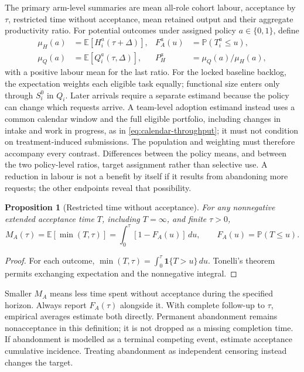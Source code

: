 \documentclass[11pt,a4paper]{amsart}
\newtheorem{proposition}{Proposition}[section]
\theoremstyle{definition}
\theoremstyle{remark}
\newcommand{\E}{\mathbb E}
\newcommand{\Prb}{\mathbb P}
\newcommand{\ind}{\mathbf 1}
\begin{document}
The primary arm-level summaries are mean all-role cohort labour, acceptance by $\tau$, restricted time without acceptance, mean retained output and their aggregate productivity ratio. For potential outcomes under assigned policy $a\in\{0,1\}$, define
\begin{equation}
\label{eq:estimands}
 \begin{aligned}
 \mu_H(a)&=\E[H_i^a(\tau+\Delta)],&
 F_A^a(u)&=\Prb(T_i^a\leq u),\\
 \mu_Q(a)&=\E[Q_i^a(\tau,\Delta)],&
 P_H^a&=\mu_Q(a)/\mu_H(a),
 \end{aligned}
\end{equation}
with a positive labour mean for the last ratio. For the locked baseline backlog, the expectation weights each eligible task equally; functional size enters only through $S_i^0$ in $Q_i$. Later arrivals require a separate estimand because the policy can change which requests arrive. A team-level adoption estimand instead uses a common calendar window and the full eligible portfolio, including changes in intake and work in progress, as in \eqref{eq:calendar-throughput}; it must not condition on treatment-induced submissions. The population and weighting must therefore accompany every contrast. Differences between the policy means, and between the two policy-level ratios, target assignment rather than selective use. A reduction in labour is not a benefit by itself if it results from abandoning more requests; the other endpoints reveal that possibility.

\begin{proposition}[Restricted time without acceptance]
\label{prop:restricted-time}
For any nonnegative extended acceptance time $T$, including $T=\infty$, and finite $\tau>0$,
\begin{equation}
\label{eq:restricted-time}
 M_A(\tau)=\E[\min(T,\tau)]
 =\int_0^\tau[1-F_A(u)]\,du,
 \qquad F_A(u)=\Prb(T\leq u).
\end{equation}
\end{proposition}

\begin{proof}
For each outcome, $\min(T,\tau)=\int_0^\tau\ind\{T>u\}\,du$. Tonelli's theorem permits exchanging expectation and the nonnegative integral.
\end{proof}

Smaller $M_A$ means less time spent without acceptance during the specified horizon. Always report $F_A(\tau)$ alongside it. With complete follow-up to $\tau$, empirical averages estimate both directly. Permanent abandonment remains nonacceptance in this definition; it is not dropped as a missing completion time. If abandonment is modelled as a terminal competing event, estimate acceptance cumulative incidence. Treating abandonment as independent censoring instead changes the target.
\end{document}
